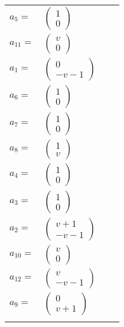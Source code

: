 \documentclass[1p]{elsarticle_modified}
\theoremstyle{definition}
\begin{document}
\begin{tabular}{m{7pt} m{180pt} m{7pt} m{180pt} }
\flushright $a_{5}=$&$\begin{pmatrix}1\\0\end{pmatrix}$ \\
\flushright $a_{11}=$&$\begin{pmatrix}v\\0\end{pmatrix}$ \\
\flushright $a_{1}=$&$\begin{pmatrix}0\\- v-1\end{pmatrix}$ \\
\flushright $a_{6}=$&$\begin{pmatrix}1\\0\end{pmatrix}$ \\
\flushright $a_{7}=$&$\begin{pmatrix}1\\0\end{pmatrix}$ \\
\flushright $a_{8}=$&$\begin{pmatrix}1\\v\end{pmatrix}$ \\
\flushright $a_{4}=$&$\begin{pmatrix}1\\0\end{pmatrix}$ \\
\flushright $a_{3}=$&$\begin{pmatrix}1\\0\end{pmatrix}$ \\
\flushright $a_{2}=$&$\begin{pmatrix}v+1\\- v-1\end{pmatrix}$ \\
\flushright $a_{10}=$&$\begin{pmatrix}v\\0\end{pmatrix}$ \\
\flushright $a_{12}=$&$\begin{pmatrix}v\\- v-1\end{pmatrix}$ \\
\flushright $a_{9}=$&$\begin{pmatrix}0\\v+1\end{pmatrix}$\\&\end{tabular}
\end{document}
